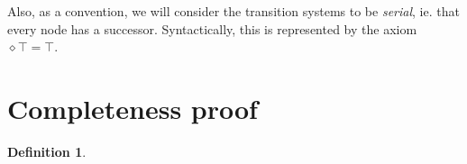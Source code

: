 \documentclass[11pt]{article}
\newtheorem{definition}{Definition}[section]
\begin{document}
Also, as a convention, we will consider the transition systems to be \emph{serial}, ie. that every node has a successor. Syntactically, this is represented by the axiom $\diamond\top = \top$.
\section{Completeness proof}\label{sec:compl}    

\begin{definition}
    
\end{definition}



\end{document}
